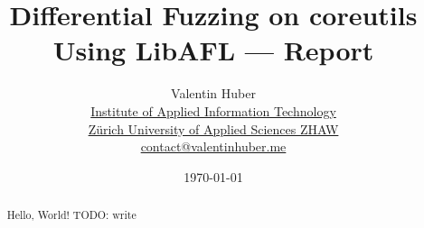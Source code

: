 \documentclass{article}
\title{%
\vspace{50px}%
    \Huge Differential Fuzzing on coreutils Using LibAFL\break%
    —\break%
    Report%
    \vspace{250px}%
}
\author{%
  Valentin Huber\vspace{5px}\\%
  \small \href{https://www.zhaw.ch/en/engineering/institutes-centres/init/}{Institute of Applied Information Technology}\\%
  \small \href{https://www.zhaw.ch/en}{Zürich University of Applied Sciences ZHAW}\\%
  \small \href{mailto://contact@valentinhuber.me}{contact@valentinhuber.me}%
  \vspace{10px}
}
\date{\today\vspace{5px}}
\begin{document}
\maketitle

\clearpage\newpage
\begin{center}
    \begin{minipage}{0.8\textwidth}
        \vspace{70px}
        \begin{abstract}
            Hello, %
            World! %
            TODO: write
        \end{abstract}
    \end{minipage}
\end{center}

\clearpage\newpage
{}
\tableofcontents
\clearpage\newpage
\restoregeometry
{}
\end{document}
